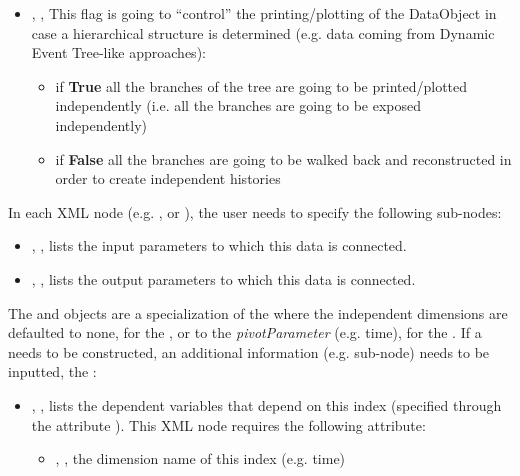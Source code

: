 \begin{itemize}
  \item {}, , 
  This flag is going to ``control'' the printing/plotting of the DataObject in 
  case a hierarchical structure is determined (e.g.
  data coming from Dynamic Event Tree-like approaches):
  \begin{itemize}
    \item if \textbf{True} all the branches of the tree are going to be printed/plotted independently 
               (i.e. all the branches are going to be exposed independently)
    \item if \textbf{False} all the branches are going to be walked back and reconstructed in order to create independent histories
  \end{itemize}
\end{itemize}
\vspace{-5mm}
In each XML node (e.g. ,  or  ), the user
needs to specify the following sub-nodes:
\begin{itemize}
  \item {}, , lists
  the input parameters to which this data is connected.
  \item {}, , lists
  the output parameters to which this data is connected.
\end{itemize}

The   and   objects are a specialization of the   where the 
independent dimensions are defaulted to none, for the , or to the \textit{pivotParameter} (e.g. time), for the .
If a   needs to be constructed, an additional information (e.g. sub-node) needs to be inputted, the  :

\begin{itemize}
  \item {}, , lists
  the dependent variables that depend on this index (specified through the attribute  ).
  This XML node requires the following attribute:
   \begin{itemize}
       \item {}, , the dimension name of this index (e.g. time)
   \end{itemize}
\end{itemize}


